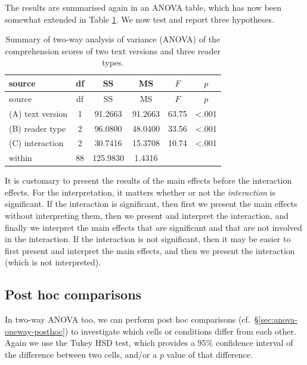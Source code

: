 \documentclass[
]{book}
\begin{document}
The results are summarised again in an ANOVA table, which has now been somewhat
extended in Table \ref{tab:DBE12anova}. We now test and report three hypotheses.

\begin{longtable}[]{@{}lccccc@{}}
\caption{\label{tab:DBE12anova} Summary of two-way analysis of variance (ANOVA) of the comprehension scores of two text versions and three reader types.}\tabularnewline
\toprule\noalign{}
source & df & SS & MS & \(F\) & \(p\) \\
\midrule\noalign{}
\endfirsthead
\toprule\noalign{}
source & df & SS & MS & \(F\) & \(p\) \\
\midrule\noalign{}
\endhead
\bottomrule\noalign{}
\endlastfoot
(A) text version & 1 & 91.2663 & 91.2663 & 63.75 & \textless.001 \\
(B) reader type & 2 & 96.0800 & 48.0400 & 33.56 & \textless.001 \\
(C) interaction & 2 & 30.7416 & 15.3708 & 10.74 & \textless.001 \\
within & 88 & 125.9830 & 1.4316 & & \\
\end{longtable}

It is customary to present the results of the main effects before the interaction effects.
For the interpretation, it matters whether or not the \emph{interaction} is significant.
If the interaction is significant, then first we present the main effects without interpreting them, then we present and interpret the interaction, and finally we interpret the main effects that are significant and that are not involved in the interaction.
If the interaction is not significant, then it may be easier to first present and interpret the main effects, and then we present the interaction (which is not interpreted).

\subsection{Post hoc comparisons}\label{sec:anova-twoway-posthoc}

In two-way ANOVA too, we can perform post hoc comparisons (cf.~§\ref{sec:anova-oneway-posthoc}) to investigate which cells or conditions differ from each other. Again we use the Tukey HSD test, which provides a 95\% confidence interval of the difference between two cells, and/or a \(p\) value of that difference.
\end{document}
